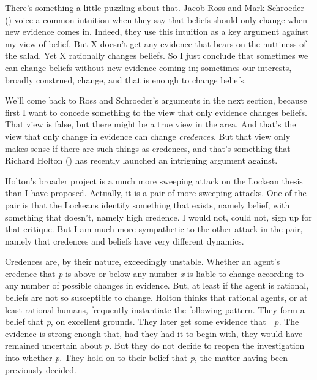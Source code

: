 \documentclass[
  10pt,
  letterpaper,
  DIV=11,
  numbers=noendperiod,
  twoside]{scrartcl}
\begin{document}
There's something a little puzzling about that. Jacob Ross and Mark
Schroeder () voice a common
intuition when they say that beliefs should only change when new
evidence comes in. Indeed, they use this intuition as a key argument
against my view of belief. But X doesn't get any evidence that bears on
the nuttiness of the salad. Yet X rationally changes beliefs. So I just
conclude that sometimes we can change beliefs without new evidence
coming in; sometimes our interests, broadly construed, change, and that
is enough to change beliefs.

We'll come back to Ross and Schroeder's arguments in the next section,
because first I want to concede something to the view that only evidence
changes beliefs. That view is false, but there might be a true view in
the area. And that's the view that only change in evidence can change
\emph{credences}. But that view only makes sense if there are such
things as credences, and that's something that Richard Holton
() has recently launched an intriguing
argument against.

Holton's broader project is a much more sweeping attack on the Lockean
thesis than I have proposed. Actually, it is a pair of more sweeping
attacks. One of the pair is that the Lockeans identify something that
exists, namely belief, with something that doesn't, namely high
credence. I would not, could not, sign up for that critique. But I am
much more sympathetic to the other attack in the pair, namely that
credences and beliefs have very different dynamics.

Credences are, by their nature, exceedingly unstable. Whether an agent's
credence that \emph{p} is above or below any number \emph{x} is liable
to change according to any number of possible changes in evidence. But,
at least if the agent is rational, beliefs are not so susceptible to
change. Holton thinks that rational agents, or at least rational humans,
frequently instantiate the following pattern. They form a belief that
\emph{p}, on excellent grounds. They later get some evidence that
\(\neg p\). The evidence is strong enough that, had they had it to begin
with, they would have remained uncertain about \emph{p}. But they do not
decide to reopen the investigation into whether \emph{p}. They hold on
to their belief that \emph{p}, the matter having been previously
decided.
\end{document}
